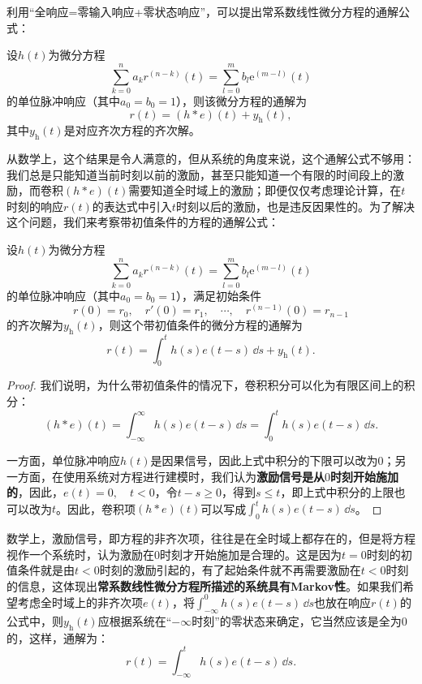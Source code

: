 利用“全响应=零输入响应+零状态响应”，可以提出常系数线性微分方程的通解公式：
\begin{theorem}
    设$h(t)$为微分方程
    \begin{equation}
        \sum_{k=0}^{n}a_{k} r^{(n-k)}(t)=\sum_{l=0}^{m}b_{l} \mathrm{e}^{(m-l)}(t)
    \end{equation}
    的单位脉冲响应（其中$a_0=b_0=1$），则该微分方程的通解为
    \begin{equation}
        r(t)=(h*e)(t)+y_{\text{h}}(t),
    \end{equation}
    其中$y_{\text{h}}(t)$是对应齐次方程的齐次解。
\end{theorem}

从数学上，这个结果是令人满意的，但从系统的角度来说，这个通解公式不够用：我们总是只能知道当前时刻以前的激励，甚至只能知道一个有限的时间段上的激励，而卷积$(h*e)(t)$需要知道全时域上的激励；即便仅仅考虑理论计算，在$t$时刻的响应$r(t)$的表达式中引入$t$时刻以后的激励，也是违反因果性的。为了解决这个问题，我们来考察带初值条件的方程的通解公式：

\begin{theorem}
    设$h(t)$为微分方程
    \begin{equation}
        \sum_{k=0}^{n}a_{k} r^{(n-k)}(t)=\sum_{l=0}^{m}b_{l} \mathrm{e}^{(m-l)}(t)
    \end{equation}
    的单位脉冲响应（其中$a_0=b_0=1$），满足初始条件
    \begin{equation}
        r(0)=r_0,\quad r'(0)=r_1,\quad \cdots,\quad r^{(n-1)}(0)=r_{n-1}
    \end{equation}
    的齐次解为$y_{\text{h}}(t)$，则这个带初值条件的微分方程的通解为
    \begin{equation}
        r(t)=\int_{0}^{t}h(s)e(t-s)\,\dd s + y_{\text{h}}(t).
    \end{equation}
\end{theorem}
\begin{proof}
    我们说明，为什么带初值条件的情况下，卷积积分可以化为有限区间上的积分：
    \begin{equation}
        (h*e)(t)=\int_{-\infty}^{\infty} h(s)e(t-s)\,\dd s=\int_{0}^{t} h(s)e(t-s)\,\dd s.
    \end{equation}

    一方面，单位脉冲响应$h(t)$是因果信号，因此上式中积分的下限可以改为$0$；另一方面，在使用系统对方程进行建模时，我们认为\textbf{激励信号是从$0$时刻开始施加的}，因此，$e(t)=0,\quad t<0$，令$t-s\geq 0$，得到$s\leq t$，即上式中积分的上限也可以改为$t$。因此，卷积项$(h*e)(t)$可以写成$\int_{0}^{t} h(s)e(t-s)\,\dd s$。
\end{proof}

数学上，激励信号，即方程的非齐次项，往往是在全时域上都存在的，但是将方程视作一个系统时，认为激励在$0$时刻才开始施加是合理的。这是因为$t=0$时刻的初值条件就是由$t<0$时刻的激励引起的，有了起始条件就不再需要激励在$t<0$时刻的信息，这体现出\textbf{常系数线性微分方程所描述的系统具有Markov性}。如果我们希望考虑全时域上的非齐次项$e(t)$，将$\int_{-\infty}^0 h(s)e(t-s)\,\dd s$也放在响应$r(t)$的公式中，则$y_{\text{h}}(t)$应根据系统在“$-\infty$时刻”的零状态来确定，它当然应该是全为$0$的，这样，通解为：
\begin{equation}
    r(t)=\int_{-\infty}^{t} h(s)e(t-s)\,\dd s.
\end{equation}
